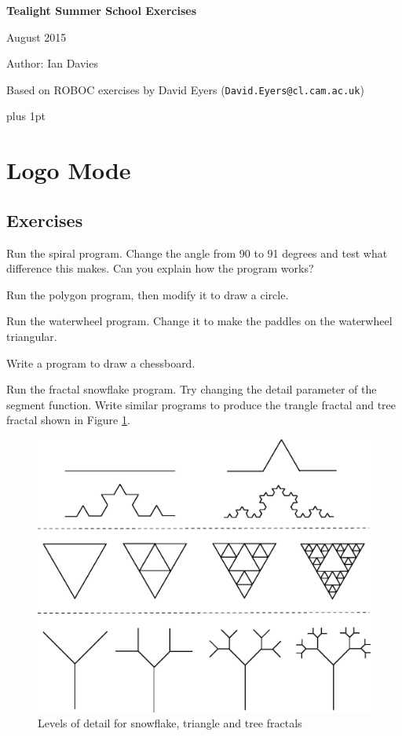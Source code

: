 \documentclass[12pt,a4paper,twoside]{article}
\renewcommand{\_}{\texttt{\symbol{95}}}
\begin{document}
\centerline{\textbf{\LARGE Tealight Summer School Exercises}}
\vspace{0.5cm}
\centerline{August 2015}
\centerline{Author: Ian Davies}
\centerline{Based on ROBOC exercises by David Eyers (\texttt{David.Eyers@cl.cam.ac.uk})}

{ \parskip 1mm plus 1pt \tableofcontents }

\newpage
\section{Logo Mode} \label{sec:logo-mode}

\subsection{Exercises}

\begin{numericlist}
\item Run the spiral program.
	Change the angle from 90 to 91 degrees and test what difference
	this makes. Can you explain how the program works?
\item Run the polygon program, then modify it to draw a circle.
\item Run the waterwheel program. Change it to make the paddles on the
	waterwheel triangular.
\item Write a program to draw a chessboard.
\item Run the fractal snowflake program. Try changing the detail parameter of the segment function. Write similar programs to produce the trangle fractal and tree fractal shown in Figure \ref{fractal}. 

\end{numericlist}

\begin{figure}[h]
\centering
\includegraphics[scale=0.5,trim=10mm 10mm 10mm 155mm]{diagrams/new_fractal}
\caption{Levels of detail for snowflake, triangle and tree fractals}
\label{fractal}
\end{figure}
\end{document}
